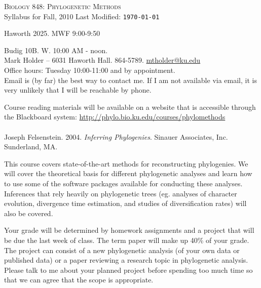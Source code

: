 \documentclass[11pt]{article}
\begin{document}
{\center
\Large
\textsc{Biology 848: Phylogenetic Methods}\\
\vskip 1cm
\large Syllabus for Fall, 2010 \hskip 6cm Last Modified: {\tt  \today}
}


\vskip 1cm
\par Haworth 2025. MWF 9:00-9:50\\
\par Budig 10B. W. 10:00 AM - noon.\\

\vskip 2mm
\noindent Mark Holder -- 6031 Haworth Hall. 864-5789. \href{mailto:mtholder@ku.edu}{mtholder@ku.edu}\\
Office hours: Tuesday 10:00-11:00 and by appointment.\\
Email is (by far) the best way to contact me.  If I am not available via email, it is very unlikely that I will be reachable by phone.

\vskip 2mm
\par
	Course reading materials will be available on a website that is accessible through the Blackboard system: \url{http://phylo.bio.ku.edu/courses/phylomethods}\\

\vskip 2mm
\\
Joseph Felsenstein. 2004. {\it Inferring Phylogenies}. Sinauer Associates, Inc. Sunderland, MA.\par

\vskip 2mm
This course covers state-of-the-art methods for reconstructing phylogenies. We will cover the theoretical basis for different phylogenetic analyses and learn how to use some of the software packages available for conducting these analyses. Inferences that rely heavily on phylogenetic trees (eg. analyses of character evolution, divergence time estimation, and studies of diversification rates) will also be covered.

\vskip 2mm\par
Your grade will be determined by homework assignments and a project that will be due the last week of class.
The term paper will make up 40\% of your grade.
The project can consist of a new phylogenetic analysis (of your own data or published data) or a paper reviewing a research topic in phylogenetic analysis. 
Please talk to me about your planned project before spending too much time so that we can agree that the scope is appropriate.
\end{document}
